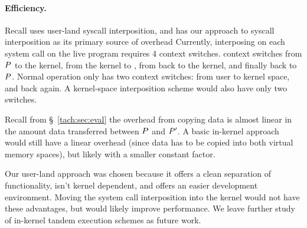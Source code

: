 \paragraph{Efficiency.}
Recall \tachyon uses user-land syscall interposition, and has
our approach to syscall interposition as its primary source of overhead
Currently, interposing on each system call on the live program requires 4
context switches. \tachyon context switches from $P$ to the
kernel, from the kernel to \tachyon, from \tachyon back to the kernel,
and finally back to $P$. Normal operation only has two context
switches: from user to kernel space, and back again.  A kernel-space
interposition scheme would also have only two switches. 

Recall from \S~\ref{tach:sec:eval} the overhead from copying data is almost
linear in the amount data transferred between $P$ and
$P'$. A basic in-kernel approach would still have a linear
overhead (since data has to be copied into both virtual memory
spaces), but likely with a smaller constant factor.

Our user-land approach was chosen because it offers a clean separation
of functionality, isn't kernel dependent, and offers an easier
development environment.  Moving the system call interposition into
the kernel would not have these advantages, but would likely improve
performance. We leave further study of in-kernel tandem execution schemes
as future work.


